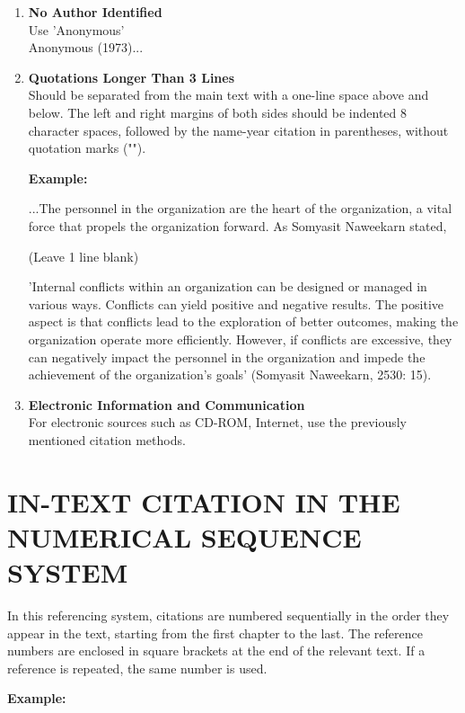 \begin{enumerate}
        \item \textbf{No Author Identified} \\
        Use 'Anonymous' \\
        Anonymous (1973)...

        \item \textbf{Quotations Longer Than 3 Lines} \\
        Should be separated from the main text with a one-line space above and below. The left and right margins of both sides should be indented 8 character spaces, followed by the name-year citation in parentheses, without quotation marks ("").

        \textbf{Example:}

        ...The personnel in the organization are the heart of the organization, a vital force that propels the organization forward. As Somyasit Naweekarn stated,

        (Leave 1 line blank)

        'Internal conflicts within an organization can be designed or managed in various
        ways. Conflicts can yield positive and negative results. The positive aspect is that
        conflicts lead to the exploration of better outcomes, making the organization operate
        more efficiently. However, if conflicts are excessive, they can negatively impact the
        personnel in the organization and impede the achievement of the organization's goals'
        (Somyasit Naweekarn, 2530: 15).

        \item \textbf{Electronic Information and Communication}\\
        For electronic sources such as CD-ROM, Internet, use the previously mentioned
        citation methods.
        
\end{enumerate}

\section{IN-TEXT CITATION IN THE NUMERICAL SEQUENCE SYSTEM}

In this referencing system, citations are numbered sequentially in the order
they appear in the text, starting from the first chapter to the last. The reference
numbers are enclosed in square brackets at the end of the relevant text. If a reference
is repeated, the same number is used.

\textbf{Example:}

